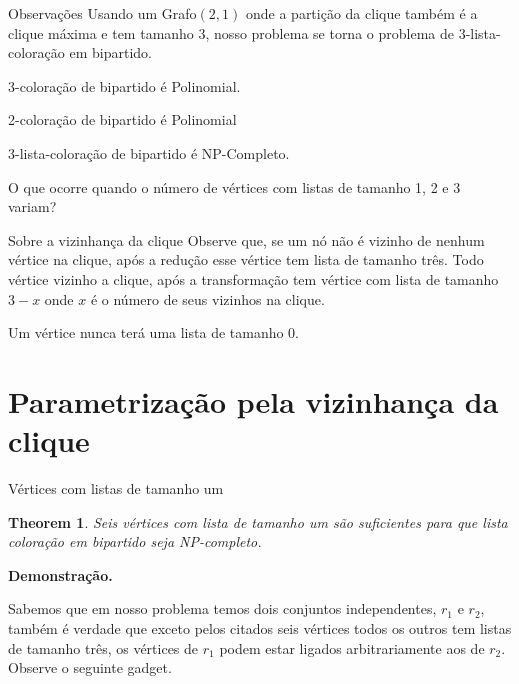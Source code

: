 \documentclass[9pt, compress]{beamer}
\newtheorem{teorema}{Theorem}
\newcommand{\?}{\textcolor{warn}{\textit{?}}}
\begin{document}
     \begin{frame}{Observações}
       Usando um Grafo$(2,1)$ onde a partição da clique também é a clique máxima e tem tamanho 3, nosso problema se torna o problema de 3-lista-coloração em bipartido.
       
       3-coloração de bipartido é Polinomial.
       
       2-coloração de bipartido é Polinomial 
       
       3-lista-coloração de bipartido é NP-Completo.
       
       O que ocorre quando o número de vértices com listas de tamanho 1, 2 e 3 variam? 
     \end{frame}
     \begin{frame}{Sobre a vizinhança da clique}
       Observe que, se um nó não é vizinho de nenhum vértice na clique, após a redução esse vértice tem lista de tamanho três. Todo vértice vizinho a clique, após a transformação tem vértice com lista de tamanho $3-x$ onde $x$ é o número de seus vizinhos na clique.
       
       Um vértice nunca terá uma lista de tamanho 0.
     \end{frame}
     \section{Parametrização pela vizinhança da clique}
     \begin{frame}{Vértices com listas de tamanho um}
       \begin{teorema}
       Seis vértices com lista de tamanho um são suficientes para que lista coloração em bipartido seja NP-completo.
       \end{teorema}
       \textbf{Demonstração.}
       
       Sabemos que em nosso problema temos dois conjuntos independentes, $r_1$ e $r_2$, também é verdade que exceto pelos citados seis vértices todos os outros tem listas de tamanho três, os vértices de $r_1$ podem estar ligados arbitrariamente aos de $r_2$. Observe o seguinte gadget.
     \end{frame}
     
\end{document}
